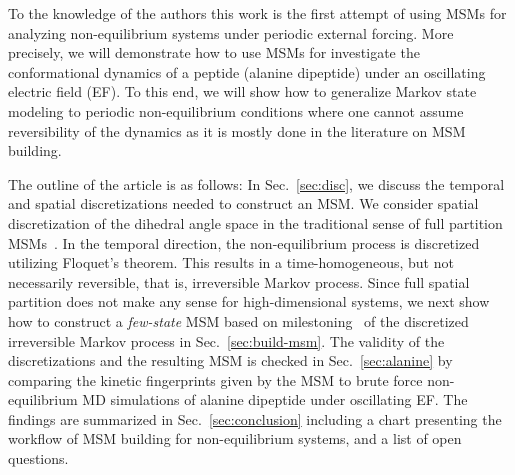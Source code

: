 \documentclass[journal=jctcce,manuscript=article]{achemso}
\begin{document}
To the knowledge of the authors this work is the first attempt of using MSMs for analyzing non-equilibrium systems under periodic external forcing.
More precisely, we will demonstrate how to use MSMs for investigate the conformational dynamics of a peptide (alanine dipeptide) under an oscillating electric field (EF).
To this end, we will show how to generalize Markov state modeling to periodic non-equilibrium conditions where one cannot assume reversibility of the dynamics as it is mostly done in the literature on MSM building.

The outline of the article is as follows: 
In Sec.~\ref{sec:disc}, we discuss the temporal and spatial
discretizations needed to construct an MSM. We consider spatial discretization
of the dihedral angle space in the traditional sense of full partition MSMs~\cite{pande2010everything,A19-29}.
In the temporal direction, the non-equilibrium process
is discretized utilizing Floquet's theorem. This results in a time-homogeneous, 
but not necessarily reversible, that is, irreversible Markov process. Since  full spatial partition does not make any sense
for high-dimensional systems, we next show how to construct a \emph{few-state} MSM based on milestoning~\cite{schuette2011markov,A19-29} of the discretized irreversible Markov process in Sec.~\ref{sec:build-msm}.
The validity of the discretizations and the resulting MSM is checked in Sec.~\ref{sec:alanine}
by comparing the kinetic fingerprints given by the MSM to brute force
non-equilibrium MD simulations of alanine dipeptide under oscillating EF.
The findings are summarized in Sec.~\ref{sec:conclusion} including a chart presenting
the workflow of MSM building for non-equilibrium systems, and a list of open questions.



\end{document}
